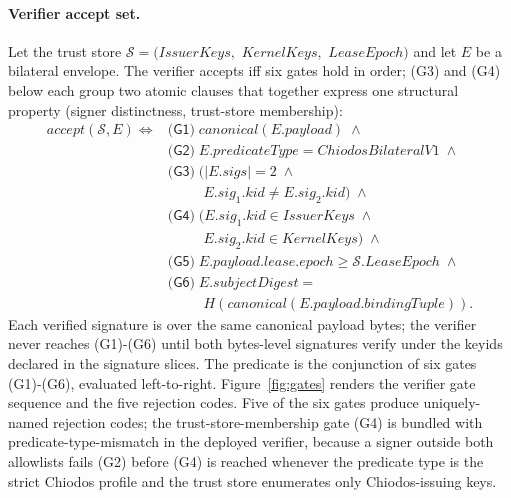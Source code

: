 \paragraph{Verifier accept set.} Let the trust store
$\mathcal{S} = (\mathit{IssuerKeys},$
$\mathit{KernelKeys},$
$\mathit{LeaseEpoch})$
and let $E$ be a bilateral envelope. The verifier accepts iff six gates hold in order; (G3) and (G4) below each group two atomic clauses that together express one structural property (signer distinctness, trust-store membership):
\begin{align*}
  \mathit{accept}(\mathcal{S},E) \iff{}
  & \textsf{(G1)}\;\mathit{canonical}(E.\mathit{payload}) \;\wedge \\
  & \textsf{(G2)}\;E.\mathit{predicateType} = \mathit{ChiodosBilateralV1} \;\wedge \\
  & \textsf{(G3)}\;\bigl(|E.\mathit{sigs}|=2 \;\wedge \\
  & \qquad\;\; E.\mathit{sig}_1.\mathit{kid} \ne E.\mathit{sig}_2.\mathit{kid}\bigr) \;\wedge \\
  & \textsf{(G4)}\;\bigl(E.\mathit{sig}_1.\mathit{kid} \in \mathit{IssuerKeys}\;\wedge \\
  & \qquad\;\; E.\mathit{sig}_2.\mathit{kid} \in \mathit{KernelKeys}\bigr) \;\wedge \\
  & \textsf{(G5)}\;E.\mathit{payload}.\mathit{lease}.\mathit{epoch} \ge \mathcal{S}.\mathit{LeaseEpoch} \;\wedge \\
  & \textsf{(G6)}\;E.\mathit{subjectDigest} = \\
  & \qquad\;\; H(\mathit{canonical}(E.\mathit{payload}.\mathit{bindingTuple})).
\end{align*}
Each verified signature is over the same canonical payload bytes; the verifier never reaches (G1)-(G6) until both bytes-level signatures verify under the keyids declared in the signature slices. The predicate is the conjunction of six gates (G1)-(G6), evaluated left-to-right. Figure~\ref{fig:gates} renders the verifier gate sequence and the five rejection codes. Five of the six gates produce uniquely-named rejection codes; the trust-store-membership gate (G4) is bundled with predicate-type-mismatch in the deployed verifier, because a signer outside both allowlists fails (G2) before (G4) is reached whenever the predicate type is the strict Chiodos profile and the trust store enumerates only Chiodos-issuing keys.

